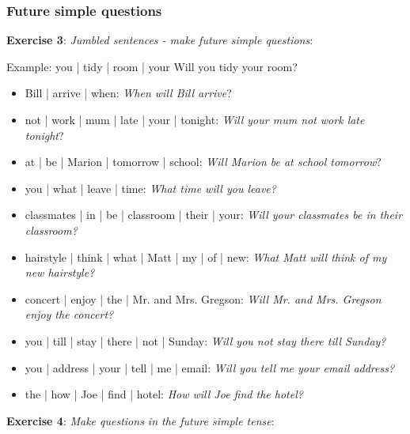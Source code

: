 \subsubsection{Future simple questions}

\textbf{Exercise 3}: \textit{Jumbled sentences - make future simple questions}:

Example:
you | tidy | room | your
Will you tidy your room?

\begin{itemize}

\item Bill | arrive | when: \textit{When will Bill arrive}?
\item not | work | mum | late | your | tonight: \textit{Will your mum not work late tonight}?
\item at | be | Marion | tomorrow | school: \textit{Will Marion be at school tomorrow}?
\item you | what | leave | time: \textit{What time will you leave?}
\item classmates | in | be | classroom | their | your: \textit{Will your classmates be in their classroom?}
\item hairstyle | think | what | Matt | my | of | new: \textit{What Matt will think of my new hairstyle?}
\item concert | enjoy | the | Mr. and Mrs. Gregson: \textit{Will Mr. and Mrs. Gregson enjoy the concert?}
\item you | till | stay | there | not | Sunday: \textit{Will you not stay there till Sunday?}
\item you | address | your | tell | me | email: \textit{Will you tell me your email address?}
\item the | how | Joe | find | hotel: \textit{How will Joe find the hotel?}
\end{itemize}

\textbf{Exercise 4}: \textit{Make questions in the future simple tense}:


